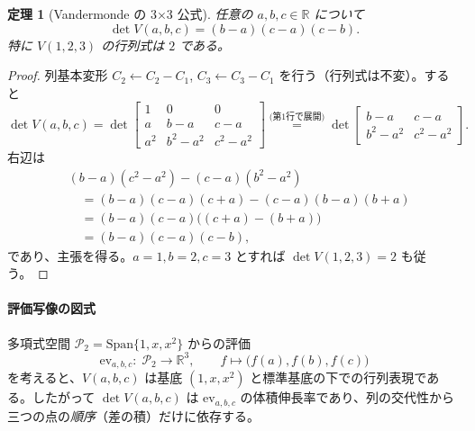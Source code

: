 \documentclass[luatexja,ja=standard,a4paper,12pt]{bxjsarticle}
\newcommand{\R}{\mathbb{R}}
\theoremstyle{definition}
\theoremstyle{plain}
\newtheorem{theorem}{定理}
\theoremstyle{remark}
\begin{document}
\begin{theorem}[Vandermonde の 3×3 公式]
\label{thm:vand3}
任意の $a,b,c\in\R$ について
\[
  \det V(a,b,c)=(b-a)(c-a)(c-b).
\]
特に $V(1,2,3)$ の行列式は $2$ である。
\end{theorem}

\begin{proof}
列基本変形 $C_2\leftarrow C_2-C_1$, $C_3\leftarrow C_3-C_1$ を行う（行列式は不変）。すると
\[
  \det V(a,b,c)=\det
  \begin{bmatrix}
    1 & 0 & 0\\
    a & b-a & c-a\\
    a^2 & b^2-a^2 & c^2-a^2
  \end{bmatrix}
  \stackrel{\text{(第1行で展開)}}{=}
  \det\begin{bmatrix}
    b-a & c-a\\ b^2-a^2 & c^2-a^2
  \end{bmatrix}.
\]
右辺は
\begin{align*}
  &(b-a)(c^2-a^2)-(c-a)(b^2-a^2)\\
  &\quad=(b-a)(c-a)(c+a)-(c-a)(b-a)(b+a)\\
  &\quad=(b-a)(c-a)\bigl( (c+a)-(b+a) \bigr)\\
  &\quad=(b-a)(c-a)(c-b),
\end{align*}
であり、主張を得る。$a=1,b=2,c=3$ とすれば $\det V(1,2,3)=2$ も従う。
\end{proof}

\paragraph{評価写像の図式} 多項式空間 $\mathcal{P}_2=\mathrm{Span}\{1,x,x^2\}$ からの評価
\[
  \mathrm{ev}_{a,b,c}:\; \mathcal{P}_2\longrightarrow \R^3,\qquad f\longmapsto \bigl(f(a),f(b),f(c)\bigr)
\]
を考えると、$V(a,b,c)$ は基底 $(1,x,x^2)$ と標準基底の下での行列表現である。したがって $\det V(a,b,c)$ は $\mathrm{ev}_{a,b,c}$ の体積伸長率であり、列の交代性から三つの点の\emph{順序}（差の積）だけに依存する。

\begin{center}
\end{center}
\end{document}

